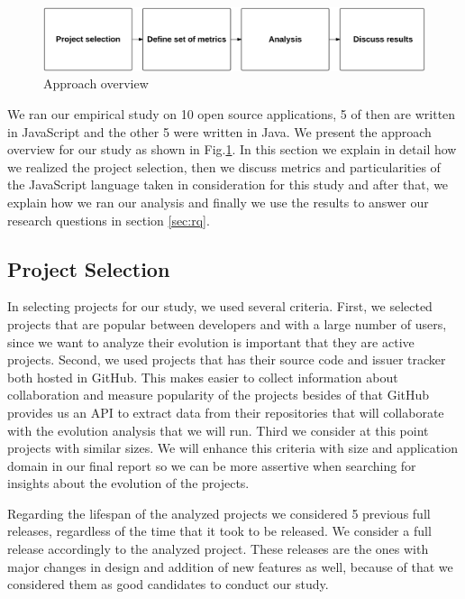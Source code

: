  \begin{figure}[thb!]
 	\caption{Approach overview}
 	\centering
 	\label{fig:approach_overview}
 	\includegraphics[width=1\textwidth]{figures/approach_overview}
 \end{figure}

We ran our empirical study on 10 open source applications, 5 of then are written in JavaScript and the other 5 were written in Java. We present the approach overview for our study as shown in Fig.\ref{fig:approach_overview}. In this section we explain in detail how we realized the project selection, then we discuss metrics and particularities of the JavaScript language taken in consideration for this study and after that, we explain how we ran our analysis and finally we use the results to answer our research questions in section \ref{sec:rq}.

\subsection{Project Selection}

In selecting projects for our study, we used several criteria. First, we selected projects that are popular between developers and with a large number of users, since we want to analyze their evolution is important that they are active projects. Second, we used projects that has their source code and issuer tracker both hosted in GitHub. This makes easier to collect information about collaboration and measure popularity of the projects besides of that GitHub provides us an API to extract data from their repositories that will collaborate with the evolution analysis that we will run. Third we consider at this point projects with similar sizes. We will enhance this criteria with size and application domain in our final report so we can be more assertive when searching for insights about the evolution of the projects.

Regarding the lifespan of the analyzed projects we considered 5 previous full releases, regardless of the time that it took to be released. We consider a full release accordingly to the analyzed project. These releases are the ones with major changes in design and addition of new features as well, because of that we considered them as good candidates to conduct our study.  

